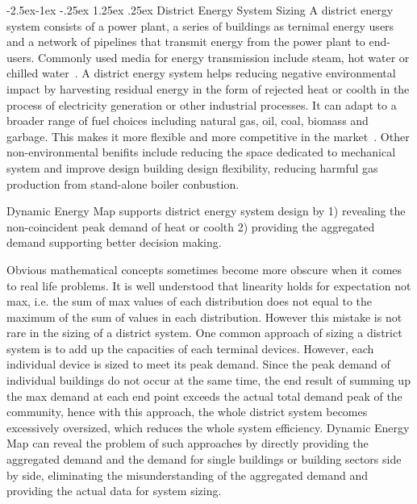 \documentclass[hidelinks,12pt]{article}
\makeatletter
\renewcommand\paragraph{\@startsection{paragraph}{4}{\z@}%
            {-2.5ex\@plus -1ex \@minus -.25ex}%
            {1.25ex \@plus .25ex}%
            {\normalfont\normalsize\bfseries}}
\makeatother
\begin{document}
\paragraph{District Energy System Sizing}\label{district}
A district energy system consists of a power plant, a series of
buildings as ternimal energy users and a network of pipelines that
transmit energy from the power plant to end-users. Commonly used media
for energy transmission include steam, hot water or chilled
water~\cite{baird2014}. A district energy system helps reducing
negative environmental impact by harvesting residual energy in the
form of rejected heat or coolth in the process of electricity
generation or other industrial processes. It can adapt to a broader
range of fuel choices including natural gas, oil, coal, biomass and
garbage. This makes it more flexible and more competitive in the
market~\cite{IDEA2005}. Other non-environmental benifits include
reducing the space dedicated to mechanical system and improve design
building design flexibility, reducing harmful gas production from
stand-alone boiler conbustion.

Dynamic Energy Map supports district energy system design by 1)
revealing the non-coincident peak demand of heat or coolth 2)
providing the aggregated demand supporting better decision making.

Obvious mathematical concepts sometimes become more obscure when it
comes to real life problems. It is well understood that linearity
holds for expectation not max, i.e. the sum of max values of each
distribution does not equal to the maximum of the sum of values in
each distribution. However this mistake is not rare in the sizing of a
district system. One common approach of sizing a district system is to
add up the capacities of each terminal devices. However, each
individual device is sized to meet its peak demand. Since the peak
demand of individual buildings do not occur at the same time, the end
result of summing up the max demand at each end point exceeds the
actual total demand peak of the community, hence with this approach,
the whole district system becomes excessively oversized, which reduces
the whole system efficiency. Dynamic Energy Map can reveal the problem
of such approaches by directly providing the aggregated demand and the
demand for single buildings or building sectors side by side,
eliminating the misunderstanding of the aggregated demand and
providing the actual data for system sizing.
\end{document}
